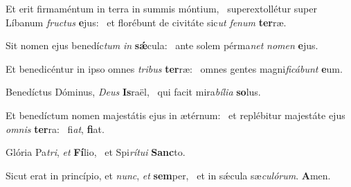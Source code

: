 \item Et erit firmaméntum in terra in summis móntium,~\pscross{} superextollétur super Líbanum \textit{fructus} \textbf{e}jus:~\psstar{} et florébunt de civitáte sic\textit{ut} \textit{fenum} \textbf{ter}ræ.
\item Sit nomen ejus benedíc\textit{tum} \textit{in} \textbf{sǽ}cula:~\psstar{} ante solem pérma\textit{net} \textit{nomen} \textbf{e}jus.
\item Et benedicéntur in ipso omnes \textit{tribus} \textbf{ter}ræ:~\psstar{} omnes gentes magni\textit{ficábunt} \textbf{e}um.
\item Benedíctus Dóminus, \textit{Deus} \textbf{Is}raël,~\psstar{} qui facit mira\textit{bília} \textbf{so}lus.
\item Et benedíctum nomen majestátis ejus in ætérnum:~\pscross{} et replébitur majestáte ejus \textit{omnis} \textbf{ter}ra:~\psstar{} fi\textit{at}, \textbf{fi}at.
\item Glória Pa\textit{tri}, \textit{et} \textbf{Fí}lio,~\psstar{} et Spi\textit{rítui} \textbf{Sanc}to.
\item Sicut erat in princípio, et \textit{nunc}, \textit{et} \textbf{sem}per,~\psstar{} et in sǽcula sæ\textit{culórum}. \textbf{A}men.
